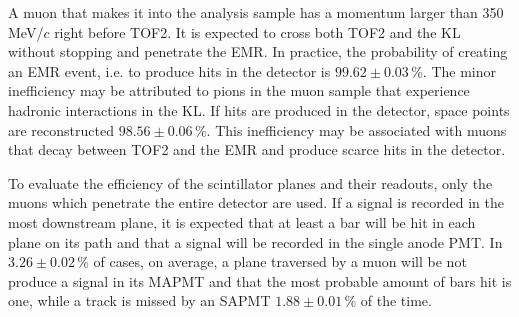 
A muon that makes it into the analysis sample has a momentum larger than 350\,MeV/$c$ right before TOF2. It is expected to cross both TOF2 and the KL without stopping and penetrate the EMR. In practice, the probability of creating an EMR event, i.e. to produce hits in the detector is $99.62\pm0.03\,\%$. The minor inefficiency may be attributed to pions in the muon sample that experience hadronic interactions in the KL. If hits are produced in the detector, space points are reconstructed $98.56\pm0.06\,\%$. This inefficiency may be associated with muons that decay between TOF2 and the EMR and produce scarce hits in the detector.

To evaluate the efficiency of the scintillator planes and their readouts, only the muons which penetrate the entire detector are used. If a signal is recorded in the most downstream plane, it is expected that at least a bar will be hit in each plane on its path and that a signal will be recorded in the single anode PMT.
In $3.26\pm0.02\,\%$ of cases, on average, a plane traversed by a muon will be not produce a signal in its MAPMT and that the most probable amount of bars hit is one, while
a track is missed by an SAPMT $1.88\pm0.01\,\%$ of the time. 

%


